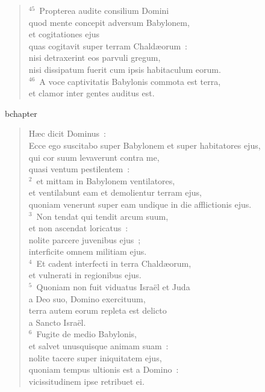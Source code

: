 \begin{verse}
${}^{45}$~Propterea audite consilium Domini\\ quod mente concepit adversum Babylonem,\\ et cogitationes ejus\\ quas cogitavit super terram Chald\ae orum~:\\ nisi detraxerint eos parvuli gregum,\\ nisi dissipatum fuerit cum ipsis habitaculum eorum.\\
${}^{46}$~A voce captivitatis Babylonis commota est terra,\\ et clamor inter gentes auditus est.\end{verse}


bchapter\begin{verse}\vspace{-19pt}H\ae c dicit Dominus~:\\ Ecce ego suscitabo super Babylonem et super habitatores ejus,\\ qui cor suum levaverunt contra me,\\ quasi ventum pestilentem~:\\
${}^{2}$~et mittam in Babylonem ventilatores,\\ et ventilabunt eam et demolientur terram ejus,\\ quoniam venerunt super eam undique in die afflictionis ejus.\\
${}^{3}$~Non tendat qui tendit arcum suum,\\ et non ascendat loricatus~:\\ nolite parcere juvenibus ejus~;\\ interficite omnem militiam ejus.\\
${}^{4}$~Et cadent interfecti in terra Chald\ae orum,\\ et vulnerati in regionibus ejus.\\
${}^{5}$~Quoniam non fuit viduatus Isra\"el et Juda\\ a Deo suo, Domino exercituum,\\ terra autem eorum repleta est delicto\\ a Sancto Isra\"el.\\
${}^{6}$~Fugite de medio Babylonis,\\ et salvet unusquisque animam suam~:\\ nolite tacere super iniquitatem ejus,\\ quoniam tempus ultionis est a Domino~:\\ vicissitudinem ipse retribuet ei.\\

\end{verse}
